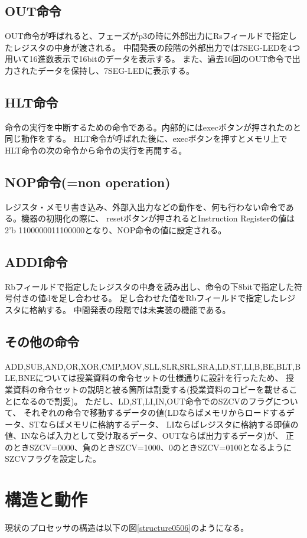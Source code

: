 \documentclass[a4j,titlepage]{jarticle}
\begin{document}
\subsection{OUT命令}
OUT命令が呼ばれると、フェーズがp3の時に外部出力にRsフィールドで指定したレジスタの中身が渡される。
中間発表の段階の外部出力では7SEG-LEDを4つ用いて16進数表示で16bitのデータを表示する。
また、過去16回のOUT命令で出力されたデータを保持し、7SEG-LEDに表示する。

\subsection{HLT命令}
命令の実行を中断するための命令である。内部的にはexecボタンが押されたのと同じ動作をする。
HLT命令が呼ばれた後に、execボタンを押すとメモリ上でHLT命令の次の命令から命令の実行を再開する。

\subsection{NOP命令(=non operation)}
レジスタ・メモリ書き込み、外部入出力などの動作を、何も行わない命令である。機器の初期化の際に、
resetボタンが押されるとInstruction Registerの値は2'b 1100000011100000となり、NOP命令の値に設定される。

\subsection{ADDI命令}
Rbフィールドで指定したレジスタの中身を読み出し、命令の下8bitで指定した符号付きの値dを足し合わせる。
足し合わせた値をRbフィールドで指定したレジスタに格納する。
中間発表の段階では未実装の機能である。

\subsection{その他の命令}
ADD,SUB,AND,OR,XOR,CMP,MOV,SLL,SLR,SRL,SRA,LD,ST,LI,B,BE,BLT,BLE,BNEについては授業資料の命令セットの仕様通りに設計を行ったため、
授業資料の命令セットの説明と被る箇所は割愛する(授業資料のコピーを載せることになるので割愛)。
ただし、LD,ST,LI,IN,OUT命令でのSZCVのフラグについて、
それぞれの命令で移動するデータの値(LDならばメモリからロードするデータ、STならばメモリに格納するデータ、
LIならばレジスタに格納する即値の値、INならば入力として受け取るデータ、OUTならば出力するデータ)が、
正のときSZCV=0000、負のときSZCV=1000、0のときSZCV=0100となるようにSZCVフラグを設定した。


\section{構造と動作}
現状のプロセッサの構造は以下の図\ref{structure0506}のようになる。
\end{document}
